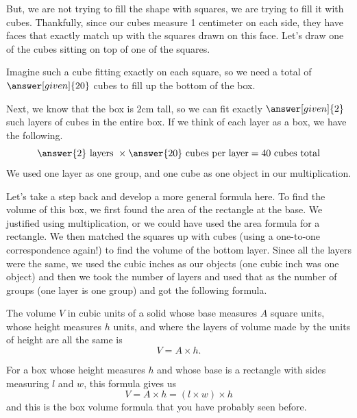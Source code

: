 \documentclass{ximera}
\begin{document}
\begin{example}
But, we are not trying to fill the shape with squares, we are trying to fill it with cubes. Thankfully, since our cubes measure 1 centimeter on each side, they have faces that exactly match up with the squares drawn on this face. Let's draw one of the cubes sitting on top of one of the squares.
\begin{image}
\end{image}
Imagine such a cube fitting exactly on each square, so we need a total of $\answer[given]{20}$ cubes to fill up the bottom of the box.

Next, we know that the box is $2$cm tall, so we can fit exactly $\answer[given]{2}$ such layers of cubes in the entire box. If we think of each layer as a box, we have the following.
\[
\answer{2} \textrm{ layers } \times \answer{20} \textrm{ cubes per layer} = 40 \textrm{ cubes total}
\]
We used one layer as one group, and one cube as one object in our multiplication.
\end{example}

Let's take a step back and develop a more general formula here. To find the volume of this box, we first found the area of the rectangle at the base. We justified using multiplication, or we could have used the area formula for a rectangle. We then matched the squares up with cubes (using a one-to-one correspondence again!) to find the volume of the bottom layer. Since all the layers were the same, we used the cubic inches as our objects (one cubic inch was one object) and then we took the number of layers and used that as the number of groups (one layer is one group) and got the following formula.
\begin{theorem}
The volume $V$ in cubic units of a solid whose base measures $A$ square units, whose height measures $h$ units, and where the layers of volume made by the units of height are all the same is
\[
V = A \times h.
\]
\end{theorem}
For a box whose height measures $h$ and whose base is a rectangle with sides measuring $l$ and $w$, this formula gives us
\[
V = A \times h = (l \times w) \times h
\]
and this is the box volume formula that you have probably seen before.
\end{document}
